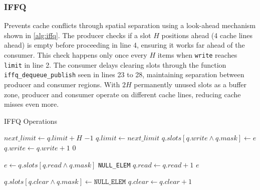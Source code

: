 \subsubsection{\acf{IFFQ}}
Prevents cache conflicts through spatial separation using a look-ahead mechanism shown in \cref{alg:iffq}. The producer checks if a slot $H$ positions ahead (4 cache lines ahead) is empty before proceeding in line 4, ensuring it works far ahead of the consumer. This check happens only once every $H$ items when \texttt{write} reaches \texttt{limit} in line 2. The consumer delays clearing slots through the function \texttt{iffq\_dequeue\_publish} seen in lines 23 to 28, maintaining separation between producer and consumer regions. With $2H$ permanently unused slots as a buffer zone, producer and consumer operate on different cache lines, reducing cache misses even more. \cite{MaffioneCacheAware}

\begin{algorithm}[!ht]
   \centering
   \captionsetup{justification=centering}
   \caption{\ac{IFFQ} Operations \cite{MaffioneCacheAware}}
   \label{alg:iffq}
   \scriptsize
   \begin{algorithmic}[1]
            
               \State $next\_limit \gets q.limit + H$
                   \State \Return $-1$ 
               \EndIf
               \State $q.limit \gets next\_limit$ 
           \EndIf
           \State $q.slots[q.write \land q.mask] \gets e$
           \State $q.write \gets q.write + 1$
           \State \Return $0$
       \EndFunction
       
       \State
       
           \State $e \gets q.slots[q.read \land q.mask]$
               \State \Return \texttt{NULL\_ELEM}
           \EndIf
           \State $q.read \gets q.read + 1$
           \State \Return $e$
       \EndFunction
       
       \State
       
               \State $q.slots[q.clear \land q.mask] \gets \texttt{NULL\_ELEM}$
               \State $q.clear \gets q.clear + 1$
           \EndWhile
       \EndFunction
   \end{algorithmic}
\end{algorithm}

